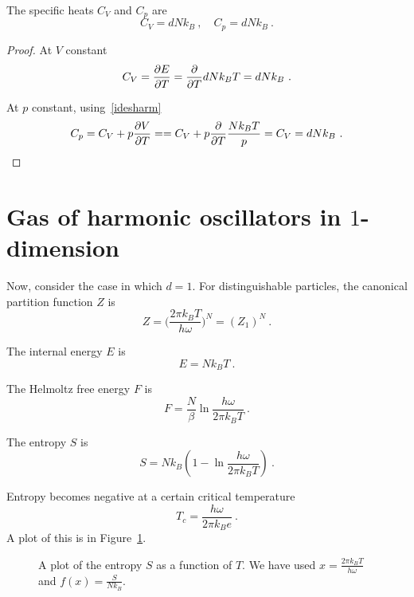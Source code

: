     The specific heats $C_V$ and $C_p$ are 
    \begin{equation*}
        C_V = d N k_B  ~, \quad C_p = d N k_B ~. 
    \end{equation*}
    \begin{proof}
        At $V$ constant
        \begin{equation*}
            C_V = \frac{\partial E}{\partial T} = \frac{\partial}{\partial T} d N k_B T  = d N k_B ~.
        \end{equation*}

        At $p$ constant, using~\eqref{idesharm}
        \begin{equation*}
            C_p = C_V + p \frac{\partial V}{\partial T} = = C_V + p \frac{\partial}{\partial T} \frac{N k_B T}{p} = C_V = d N k_B  ~.
        \end{equation*}
    \end{proof}

\section{Gas of harmonic oscillators in $1$-dimension}

    Now, consider the case in which $d = 1$.
    For distinguishable particles, the canonical partition function $Z$ is 
    \begin{equation*}
        Z = \Big (\frac{2 \pi k_B T}{h \omega} \Big )^{N} = (Z_1)^N ~.
    \end{equation*}
    
    The internal energy $E$ is 
    \begin{equation*}
        E = N k_B T ~.
    \end{equation*}
   
    The Helmoltz free energy $F$ is 
    \begin{equation*}
        F = \frac{N}{\beta} \ln \frac{h \omega}{2 \pi k_B T} ~.
    \end{equation*}
    
    The entropy $S$ is 
    \begin{equation*}
        S = N k_B (1 - \ln \frac{h \omega}{2 \pi k_B T}) ~.
    \end{equation*}
 
    Entropy becomes negative at a certain critical temperature
    \begin{equation*}
        T_c = \frac{h \omega}{2 \pi k_B e} ~.
    \end{equation*}
    A plot of this is in Figure~\ref{can:ent2}.
    \begin{figure}[h!]
        \centering
        \caption{A plot of the entropy $S$ as a function of $T$. We have used $x = \frac{2 \pi k_B T}{h \omega}$ and $f(x) = \frac{S}{N k_B}$.}
        \label{can:ent2}
    \end{figure}

